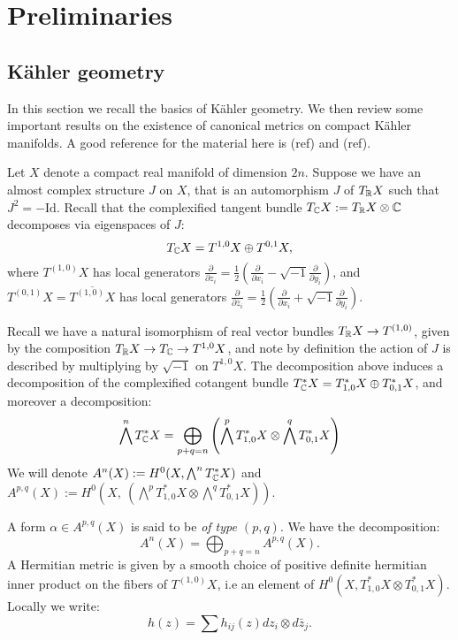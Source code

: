 \chapter{Preliminaries}

\section{K\"ahler geometry}

In this section we recall the basics of K\"ahler geometry. We then review some important results on the existence of canonical metrics on compact K\"ahler manifolds. A good reference for the material here is (ref) and (ref).

Let \(X\) denote a compact real manifold of dimension \(2n\). Suppose we have an almost complex structure \(J\) on \(X\), that is an automorphism \(J\) of \(T_{\mathbb{R}} X\) such that \(J^2 = - \text{Id}\). Recall that the complexified tangent bundle \(T_{\mathbb{C}} X := T_{\mathbb{R}} X \otimes \mathbb{C}\) decomposes via eigenspaces of \(J\):
\[
T_{\mathbb{C}} X = T^{1,0} X \oplus T^{0,1} X,
\]
where \(T^{(1,0)} X\) has local generators \(\frac{\partial}{\partial z_i} = \frac{1}{2} \left( \frac{\partial}{\partial x_i}  - \sqrt{-1} \frac{\partial}{\partial y_i}  \right) \), and \(T^{(0,1)} X = \overline{T^{(1,0)} X}\) has local generators \(\frac{\partial}{\partial \bar{z}_i} = \frac{1}{2} \left( \frac{\partial}{\partial x_i}  + \sqrt{-1} \frac{\partial}{\partial y_i}  \right)\).

Recall we have a natural isomorphism of real vector bundles \(T_{\mathbb{R}} X \to T^{(1,0)}\), given by the composition \(T_{\mathbb{R}} X \to T_{\mathbb{C}} \to T^{1,0}X\), and note by definition the action of \(J\) is described by  multiplying by \(\sqrt{-1}\) on \(T^{1,0} X\). The decomposition above induces a decomposition of the complexified cotangent bundle \(T^*_{\mathbb{C}} X = T^*_{1,0} X \oplus T^*_{0,1} X\), and moreover a decomposition:
\[
\bigwedge^n T^*_{\mathbb{C}} X = \bigoplus_{p+q = n} \left(\bigwedge^p T^*_{1,0} X \otimes \bigwedge^q T^*_{0,1} X   \right)
\]
We will denote \(A^n(X):= H^0(X,\bigwedge^n T^*_{\mathbb{C}} X)\) and \(A^{p,q}(X) := H^0 \left( X, \ \left(\bigwedge^p T^*_{1,0} X \otimes \bigwedge^q T^*_{0,1} X   \right) \right) \).

A form \(\alpha \in A^{p,q}(X)\) is said to be \textit{of type \((p,q)\)}. We have the decomposition:
\[
A^n(X) = \bigoplus_{p+q = n} A^{p,q}(X).
\]
A Hermitian metric is given by a smooth choice of positive definite hermitian inner product on the fibers of \(T^{(1,0)}X\), i.e an element of \(H^0(X, T^*_{1,0} X \otimes T^*_{0,1} X) \). Locally we write:
\[
h(z) = \sum h_{ij}(z) dz_i \otimes d\bar{z}_j.
\]

